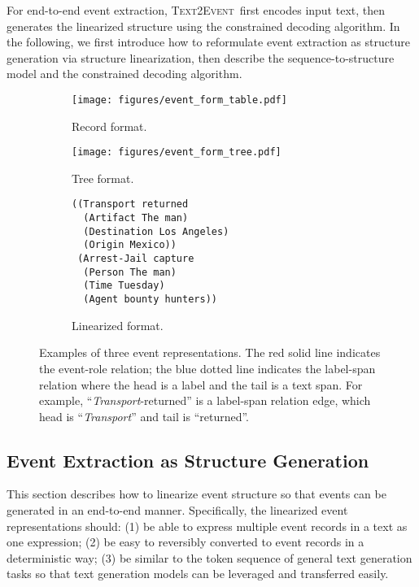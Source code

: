 \documentclass[11pt,a4paper]{article}
\newcommand\modelname{\textsc{Text2Event}}
\newcommand{\eventtpye}[1]{\textit{#1}}
\begin{document}
For end-to-end event extraction, \modelname\, first encodes input text, then generates the linearized structure using the constrained decoding algorithm.
In the following, we first introduce how to reformulate event extraction as structure generation via structure linearization, then describe the sequence-to-structure model and the constrained decoding algorithm.


\begin{figure*}[!tphb] 
  \centering
\begin{subfigure}[b]{0.32\textwidth}
    \centering
    \texttt{[image: figures/event\_form\_table.pdf]}
    \caption{Record format.}
    \label{fig:table_format}
\end{subfigure}
\begin{subfigure}[b]{0.32\textwidth}
    \centering
    \texttt{[image: figures/event\_form\_tree.pdf]}
    \caption{Tree format.}
    \label{fig:event_tree}
\end{subfigure}
\begin{subfigure}[b]{0.32\textwidth}
\begin{minipage}{.30\textwidth}
\begin{Verbatim}[fontsize=\small]
((Transport returned
  (Artifact The man)
  (Destination Los Angeles)
  (Origin Mexico))
 (Arrest-Jail capture
  (Person The man)
  (Time Tuesday)
  (Agent bounty hunters))
\end{Verbatim}
\end{minipage}
\caption{Linearized format.}
\label{fig:linearized_form}
\end{subfigure}

\caption{
  Examples of three event representations.
  The {\color{red} red solid line} indicates the event-role relation; the {\color{blue} blue dotted line} indicates the label-span relation where the head is a label and the tail is a text span.
  For example, ``\eventtpye{Transport}-returned'' is a label-span relation edge, which head is ``\eventtpye{Transport}'' and tail is ``returned''.
}
\label{fig:event_structured_representation}
\end{figure*} 
\subsection{Event Extraction as Structure Generation} \label{sec:structure_generation}

This section describes how to linearize event structure so that events can be generated in an end-to-end manner.
Specifically, the linearized event representations should:
(1) be able to express multiple event records in a text as one expression;
(2) be easy to reversibly converted to event records in a deterministic way;
(3) be similar to the token sequence of general text generation tasks so that text generation models can be leveraged and transferred easily.
\end{document}
